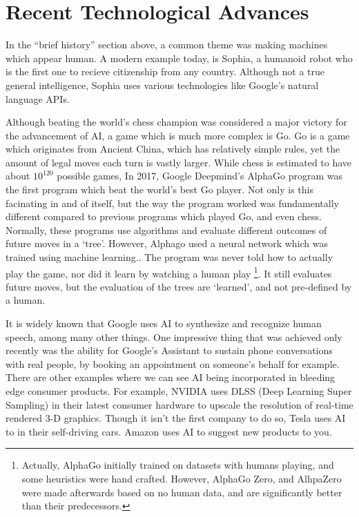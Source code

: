 \documentclass[letterpaper,12pt]{article}
\begin{document}
\section{Recent Technological Advances}

In the ``brief history'' section above, a common theme was making machines
which appear human. A modern example today, is Sophia, a humanoid robot
who is the first one to recieve citizenship from any country.
Although not a true general intelligence\cite{sopiaAI}, Sophia uses various 
technologies like Google's natural language APIs.

Although beating the world's chess champion was considered a major
victory for the advancement of AI,
a game which is much more complex is Go.
Go is a game which originates from Ancient China,
which has relatively simple rules, yet the amount of legal
moves each turn is vastly larger. While chess is estimated to have about $10^{120}$ 
possible games, 
In 2017, Google Deepmind's AlphaGo program was the first program which beat the world's
best Go player. Not only is this facinating in and of itself, but the 
way the program worked was fundamentally different compared to previous 
programs which played Go, and even chess. Normally, these programs
use algorithms and evaluate different outcomes of future moves
in a `tree'. However, Alphago used a neural network which was trained
using machine learning.\cite{alphagopaper}. The program was never told how to
actually play the game, nor did it learn by watching a human play
\footnote{Actually, AlphaGo initially trained on datasets with humans playing,
and some heuristics were hand crafted. However, AlphaGo Zero, and AlhpaZero
were made afterwards based on no human data, and are significantly
better than their predecessors.}. It still
evaluates future moves, but the evaluation of the trees are `learned', and 
not pre-defined by a human.

It is widely known that Google uses AI to synthesize and recognize human speech,
among many other things. One impressive thing that was
achieved only recently was the
ability for Google's Assistant to sustain phone conversations with real
people, by booking an appointment on someone's behalf for example. \cite{googleduplex} 
There are other examples where we can see AI being incorporated in bleeding edge consumer products.
For example, NVIDIA uses DLSS (Deep Learning Super Sampling) in their latest consumer hardware to
upscale the resolution of real-time rendered 3-D graphics.\cite{dlss}
Though it isn't the first company to do so, Tesla uses AI to in their self-driving cars.\cite{teslaautopilot}
Amazon uses AI to suggest new products to you.\cite{aznai}
\end{document}
